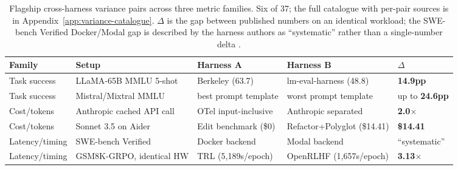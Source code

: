 \documentclass{article}
\begin{document}
\begin{table}[h]
\centering
\small
\setlength{\tabcolsep}{5pt}
\caption{Flagship cross-harness variance pairs across three
metric families. Six of 37; the full catalogue with per-pair
sources is in Appendix~\ref{app:variance-catalogue}. $\Delta$
is the gap between published numbers on an identical workload;
the SWE-bench Verified Docker/Modal gap is described by the
harness authors as ``systematic'' rather than a single-number
delta \citep{swebenchHarness}.}
\label{tab:omnibus}
\begin{tabular}{@{}lllll@{}}
\toprule
\textbf{Family} & \textbf{Setup} & \textbf{Harness A} & \textbf{Harness B} & \textbf{$\Delta$} \\
\midrule
Task success  & LLaMA-65B MMLU 5-shot     & Berkeley (63.7)           & lm-eval-harness (48.8)       & \textbf{14.9pp} \\
Task success  & Mistral/Mixtral MMLU      & best prompt template      & worst prompt template        & up to \textbf{24.6pp} \\
Cost/tokens   & Anthropic cached API call & OTel input-inclusive      & Anthropic separated          & \textbf{2.0$\times$} \\
Cost/tokens   & Sonnet 3.5 on Aider       & Edit benchmark (\$0)      & Refactor+Polyglot (\$14.41)  & \textbf{\$14.41} \\
Latency/timing & SWE-bench Verified       & Docker backend            & Modal backend                & ``systematic'' \\
Latency/timing & GSM8K-GRPO, identical HW & TRL (5{,}189s/epoch)      & OpenRLHF (1{,}657s/epoch)    & \textbf{3.13$\times$} \\
\bottomrule
\end{tabular}
\end{table}
\end{document}
